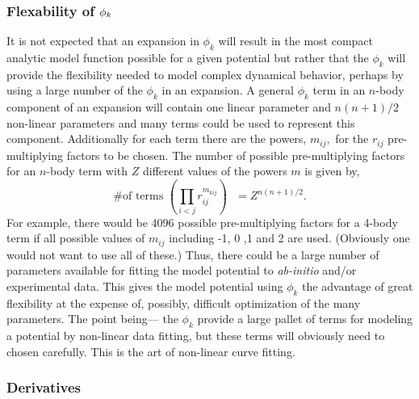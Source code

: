 \documentclass[12pt,thmsa]{article}
\begin{document}
\subsubsection{Flexability of $\protect\phi _k$}

It is not expected that an expansion in $\phi _k$ will result in the most
compact analytic model function possible for a given potential but rather
that the $\phi _k$ will provide the flexibility needed to model complex
dynamical behavior, perhaps by using a large number of the $\phi _k$ in an
expansion. A general $\phi _k$ term in an $n$-body component of an expansion
will contain one linear parameter and $n\left( n+1\right) /2$ non-linear
parameters and many terms could be used to represent this component.
Additionally for each term there are the powers, $m_{ij},$ for the $r_{ij}$
pre-multiplying factors to be chosen. The number of possible pre-multiplying
factors for an $n$-body term with $Z$ different values of the powers $m$ is
given by, 
\begin{equation}
\text{\# of terms }\left( \prod_{i<j}r_{ij}^{m_{kij}}\right) \text{ }%
=Z^{n\left( n+1\right) /2}.
\end{equation}
For example, there would be 4096 possible pre-multiplying factors for a
4-body term if all possible values of $m_{ij}$ including -1, 0 ,1 and 2 are
used. (Obviously one would not want to use all of these.) Thus, there could
be a large number of parameters available for fitting the model potential to 
\emph{ab-initio} and/or experimental data. This gives the model potential
using $\phi _k$ the advantage of great flexibility at the expense of,
possibly, difficult optimization of the many parameters. The point being---
the $\phi _k$ provide a large pallet of terms for modeling a potential by
non-linear data fitting, but these terms will obviously need to chosen
carefully. This is the art of non-linear curve fitting.

\subsubsection{Derivatives}
\end{document}
